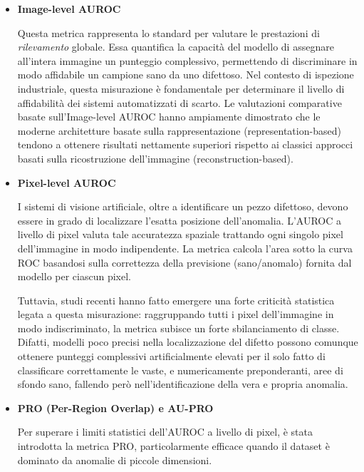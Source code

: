 \begin{itemize}
    \item \textbf{Image-level AUROC}
    
    Questa metrica rappresenta lo standard per valutare le prestazioni di \textit{rilevamento} globale. Essa quantifica la capacità del modello di assegnare all'intera immagine un punteggio complessivo, permettendo di discriminare in modo affidabile un campione sano da uno difettoso. \cite{Zheng_et_al._2022} Nel contesto di ispezione industriale, questa misurazione è fondamentale per determinare il livello di affidabilità dei sistemi automatizzati di scarto. Le valutazioni comparative basate sull'Image-level AUROC hanno ampiamente dimostrato che le moderne architetture basate sulla rappresentazione (representation-based) tendono a ottenere risultati nettamente superiori rispetto ai classici approcci basati sulla ricostruzione dell'immagine (reconstruction-based). \cite{Zheng_et_al._2022}

    \item \textbf{Pixel-level AUROC}
    
    I sistemi di visione artificiale, oltre a identificare un pezzo difettoso, devono essere in grado di localizzare l'esatta posizione dell'anomalia. L'AUROC a livello di pixel valuta tale accuratezza spaziale trattando ogni singolo pixel dell'immagine in modo indipendente. \cite{Zheng_et_al._2022} La metrica calcola l'area sotto la curva ROC basandosi sulla correttezza della previsione (sano/anomalo) fornita dal modello per ciascun pixel. \cite{Zheng_et_al._2022} 
    
    Tuttavia, studi recenti hanno fatto emergere una forte criticità statistica legata a questa misurazione: raggruppando tutti i pixel dell'immagine in modo indiscriminato, la metrica subisce un forte sbilanciamento di classe. \cite{Bertoldo_et_al._2024} Difatti, modelli poco precisi nella localizzazione del difetto possono comunque ottenere punteggi complessivi artificialmente elevati per il solo fatto di classificare correttamente le vaste, e numericamente preponderanti, aree di sfondo sano, fallendo però nell'identificazione della vera e propria anomalia. \cite{Bertoldo_et_al._2024}

    \item \textbf{PRO (Per-Region Overlap) e AU-PRO}
    
    Per superare i limiti statistici dell'AUROC a livello di pixel, è stata introdotta la metrica PRO, particolarmente efficace quando il dataset è dominato da anomalie di piccole dimensioni. \cite{Zheng_et_al._2022} 
    

\end{itemize}

